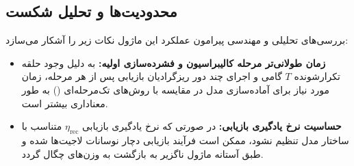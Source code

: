 \subsection{محدودیت‌ها و تحلیل شکست}
بررسی‌های تحلیلی و مهندسی پیرامون عملکرد این ماژول نکات زیر را آشکار می‌سازد:
\begin{itemize}
    \item \textbf{زمان طولانی‌تر مرحله کالیبراسیون و فشرده‌سازی اولیه:} به دلیل وجود حلقه تکرارشونده $T$ گامی و اجرای چند دور ریزگرادیان بازیابی پس از هر مرحله، زمان مورد نیاز برای آماده‌سازی مدل در مقایسه با روش‌های تک‌مرحله‌ای () به طور معناداری بیشتر است.
    \item \textbf{حساسیت نرخ یادگیری بازیابی:} در صورتی که نرخ یادگیری بازیابی $\eta_{\text{rec}}$ متناسب با ساختار مدل تنظیم نشود، ممکن است فرآیند بازیابی دچار نوسانات لاجیت‌ها شده و طبق آستانه  ماژول ناگزیر به بازگشت به وزن‌های چگال گردد.
\end{itemize}
